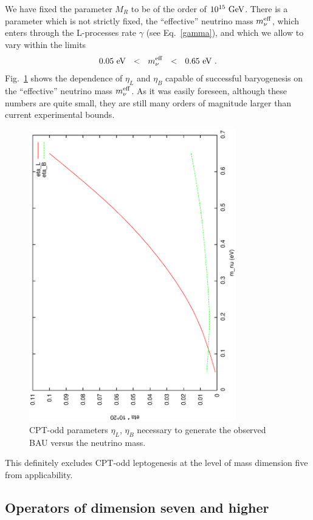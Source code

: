 \documentclass[12pt]{revtex4}
\newcommand{\meff}{m^{\rm eff}_\nu}
\newcommand{\GeV}{{\rm GeV}}
\newcommand{\eV}{{\rm eV}}
\begin{document}
	We have fixed the parameter $ M_R $ to be of the order of 
	$ 10^{15}~\GeV $.
	There is a parameter which is not strictly fixed,
	the ``effective'' neutrino mass $ \meff $, which enters
	through the
	L-processes rate $ \gamma $ (see Eq.~\eqref{gamma}),
	and which we allow to vary within the limits 
\[
	0.05~\eV ~~<~~ \meff ~~<~~0.65~\eV~.
\]
	Fig.~\ref{scan_fig} shows the dependence of $ \eta_L $ and 
	$ \eta_B $ capable
	of successful baryogenesis on the ``effective'' neutrino mass
	$ \meff $.
	As it was easily foreseen, although these numbers are quite
	small, they are still many orders of magnitude larger than
	current experimental bounds.
\begin{figure}
\includegraphics[width=9cm,angle=270]{scan.ps}
\caption{CPT-odd parameters $ \eta_L $, $ \eta_B $ necessary to generate
	the observed BAU versus the neutrino mass.}
\label{scan_fig}
\end{figure}
	This definitely excludes CPT-odd leptogenesis at the level of
	mass dimension five from applicability.

\subsection{Operators of dimension seven and higher}
\end{document}

